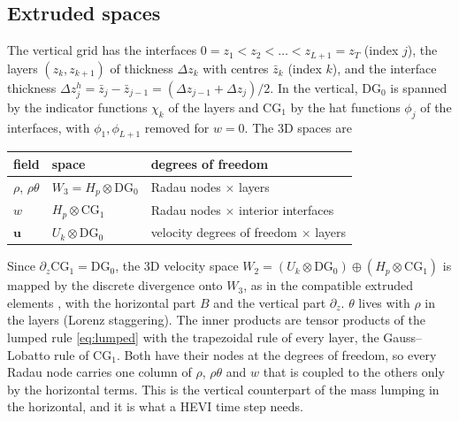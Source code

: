 \documentclass[preprint,12pt]{elsarticle}
\newcommand{\bu}{\mathbf{u}}
\theoremstyle{definition}
\begin{document}
\subsection{Extruded spaces}
The vertical grid has the interfaces $0 = z_{1} < z_{2} < \dots < z_{L+1} = z_T$ (index $j$), the layers
$(z_k, z_{k+1})$ of thickness $\Delta z_k$ with centres $\bar z_k$ (index $k$), and the interface thickness
$\Delta z^h_j = \bar z_j - \bar z_{j-1} = (\Delta z_{j-1}+\Delta z_j)/2$. In the vertical, $\mathrm{DG}_0$ is
spanned by the indicator functions $\chi_k$ of the layers and $\mathrm{CG}_1$ by the hat functions $\phi_j$
of the interfaces, with $\phi_1, \phi_{L+1}$ removed for $w = 0$. The 3D spaces are
\begin{center}
\begin{tabular}{lll}
\toprule
field & space & degrees of freedom \\
\midrule
$\rho$, $\rho\theta$ & $W_3 = H_p\otimes\mathrm{DG}_0$ & Radau nodes $\times$ layers \\
$w$ & $H_p\otimes\mathrm{CG}_1$ & Radau nodes $\times$ interior interfaces \\
$\bu$ & $U_k\otimes\mathrm{DG}_0$ & velocity degrees of freedom $\times$ layers \\
\bottomrule
\end{tabular}
\end{center}
Since $\partial_z\mathrm{CG}_1 = \mathrm{DG}_0$, the 3D velocity space
$W_2 = (U_k\otimes\mathrm{DG}_0)\oplus(H_p\otimes\mathrm{CG}_1)$ is mapped by the discrete divergence onto
$W_3$, as in the compatible extruded elements \cite{NataleShiptonCotter2016,Melvin2019}, with the
horizontal part $B$ and the vertical part $\partial_z$. $\theta$ lives with $\rho$ in the layers (Lorenz
staggering). The inner products are tensor products of the lumped rule \eqref{eq:lumped} with the
trapezoidal rule of every layer, the Gauss--Lobatto rule of $\mathrm{CG}_1$. Both have their nodes at
the degrees of freedom, so every Radau node carries one column of $\rho$, $\rho\theta$ and $w$ that is
coupled to the others only by the horizontal terms. This is the vertical counterpart of the mass lumping in
the horizontal, and it is what a HEVI time step needs.
\end{document}
